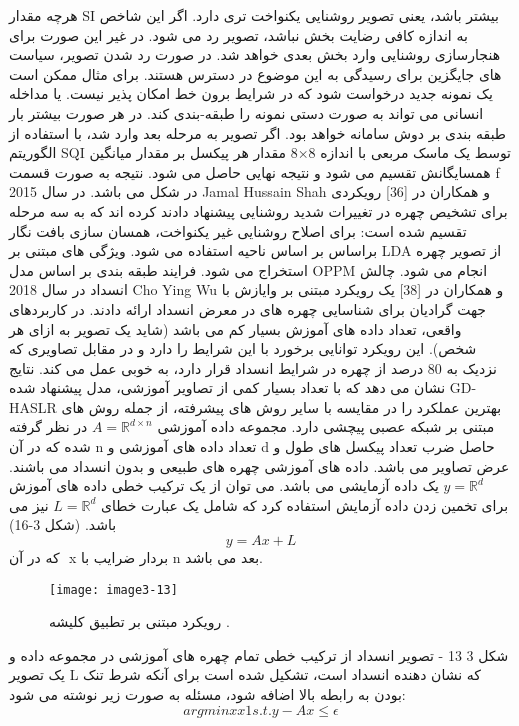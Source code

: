 هرچه مقدار SI بیشتر باشد، یعنی تصویر روشنایی یکنواخت تری دارد. اگر این شاخص به اندازه کافی رضایت بخش نباشد، تصویر رد می شود. در غیر این صورت برای هنجارسازی روشنایی وارد بخش بعدی خواهد شد. در صورت رد شدن تصویر، سیاست های جایگزین برای رسیدگی به این موضوع در دسترس هستند. برای مثال ممکن است یک نمونه جدید درخواست شود که در شرایط برون خط امکان پذیر نیست. یا مداخله انسانی می تواند به صورت دستی نمونه را طبقه-بندی کند. در هر صورت بیشتر بار طبقه بندی بر دوش سامانه خواهد بود. اگر تصویر به مرحله بعد وارد شد، با استفاده از الگوریتم SQI توسط یک ماسک مربعی با اندازه 8×8 مقدار هر پیکسل بر مقدار میانگین همسایگانش تقسیم می شود و نتیجه نهایی حاصل می شود. نتیجه به صورت قسمت f در شکل  می باشد.
در سال 2015 Jamal Hussain Shah و همکاران در [36] رویکردی برای تشخیص چهره در تغییرات شدید روشنایی پیشنهاد دادند کرده اند که به سه مرحله تقسیم شده است:
	برای اصلاح روشنایی غیر یکنواخت، همسان سازی بافت نگار براساس بر اساس ناحیه استفاده می شود.
	ویژگی های مبتنی بر LDA از تصویر چهره استخراج  می شود.
	فرایند طبقه بندی بر اساس مدل OPPM انجام می شود.
	چالش انسداد
در سال 2018 Cho Ying Wu و همکاران در [38] یک رویکرد مبتنی بر وايازش  با جهت گرادیان برای شناسایی چهره های در معرض انسداد ارائه دادند. در کاربردهای واقعی، تعداد داده های آموزش بسیار کم می باشد (شاید یک تصویر به ازای هر شخص). این رویکرد توانایی برخورد با این شرایط را دارد و در مقابل تصاویری که نزدیک به 80 درصد از چهره در شرایط انسداد قرار دارد، به خوبی عمل می کند. نتایج نشان می دهد که با تعداد بسیار کمی از تصاویر آموزشی، مدل پیشنهاد شده GD-HASLR بهترین عملکرد را در مقایسه با سایر روش های پیشرفته، از جمله روش های مبتنی بر شبکه عصبی پیچشی دارد. 
مجموعه داده  آموزشی
$A=\mathbb{R}^{d\times n}$
در نظر گرفته شده که در آن n تعداد داده های آموزشی و d حاصل ضرب تعداد پیکسل های طول و عرض تصاویر می باشد. داده های آموزشی چهره های طبیعی و بدون انسداد می باشند.
$y=\mathbb{R}^d$
یک داده آزمایشی می باشد. می توان از یک ترکیب خطی داده های آموزش برای تخمین زدن داده آزمایش استفاده کرد که شامل یک عبارت خطای
$L=\mathbb{R}^d$
نیز می باشد. (شکل 3-16) 
\begin{equation}\label{eq3-11}
y=Ax+L
\end{equation}
‏
که در آن x بردار ضرایب با n بعد می باشد.
 \begin{figure}[h]
\centering
  \texttt{[image: image3-13]}
  \caption{رویکرد مبتنی بر تطبیق کلیشه  \cite{ref1}.}
  \label{image2-1}
\end{figure}
شکل ‏3 13 - تصویر انسداد از ترکیب خطی تمام چهره های آموزشی در مجموعه داده و یک تصویر L که نشان دهنده انسداد است، تشکیل شده است
برای آنکه شرط تنک بودن به رابطه بالا اضافه شود، مسئله به صورت زیر نوشته می شود:
\begin{equation}\label{eq3-12}
argminxx1   s.t.y-Ax≤ϵ	
\end{equation}
‏


